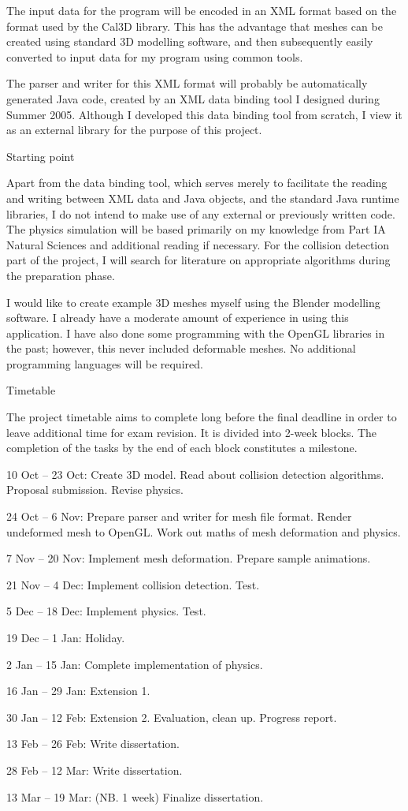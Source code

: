 \documentclass{article}
\begin{document}
The input data for the program will be encoded in an XML format based
on the format used by the Cal3D library. This has the advantage that
meshes can be created using standard 3D modelling software, and then
subsequently easily converted to input data for my program using
common tools.

The parser and writer for this XML format will probably be
automatically generated Java code, created by an XML data binding tool
I designed during Summer 2005. Although I developed this data binding
tool from scratch, I view it as an external library for the purpose of
this project.


Starting point

Apart from the data binding tool, which serves merely to facilitate
the reading and writing between XML data and Java objects, and the
standard Java runtime libraries, I do not intend to make use of any
external or previously written code. The physics simulation will be
based primarily on my knowledge from Part IA Natural Sciences and
additional reading if necessary. For the collision detection part
of the project, I will search for literature on appropriate algorithms
during the preparation phase.

I would like to create example 3D meshes myself using the Blender
modelling software. I already have a moderate amount of experience
in using this application. I have also done some programming with the
OpenGL libraries in the past; however, this never included deformable
meshes. No additional programming languages will be required.


Timetable

The project timetable aims to complete long before the final deadline
in order to leave additional time for exam revision. It is divided
into 2-week blocks. The completion of the tasks by the end of each
block constitutes a milestone.

10 Oct -- 23 Oct:
    Create 3D model. Read about collision detection algorithms.
    Proposal submission. Revise physics.

24 Oct -- 6 Nov:
    Prepare parser and writer for mesh file format.
    Render undeformed mesh to OpenGL.
    Work out maths of mesh deformation and physics.

7 Nov -- 20 Nov:
    Implement mesh deformation.
    Prepare sample animations.

21 Nov -- 4 Dec:
    Implement collision detection. Test.

5 Dec -- 18 Dec:
    Implement physics. Test.

19 Dec -- 1 Jan:
    Holiday.

2 Jan -- 15 Jan:
    Complete implementation of physics.

16 Jan -- 29 Jan:
    Extension 1.

30 Jan -- 12 Feb:
    Extension 2.
    Evaluation, clean up.
    Progress report.

13 Feb -- 26 Feb:
    Write dissertation.

28 Feb -- 12 Mar:
    Write dissertation.

13 Mar -- 19 Mar: (NB. 1 week)
    Finalize dissertation.
\end{document}
